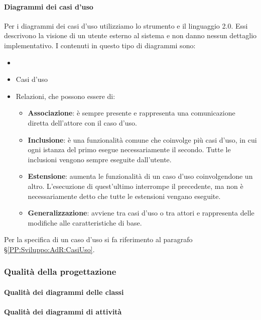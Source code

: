		\paragraph{Diagrammi dei casi d'uso}\label{DiagrammiCasiUso}
		Per i diagrammi dei casi d'uso utilizziamo lo strumento  e il linguaggio  2.0. Essi descrivono la visione di un utente
		esterno al sistema e non danno nessun dettaglio implementativo. I  contenuti in questo tipo di diagrammi sono:
		\begin{itemize}
			\item {}
			\item Casi d'uso
			\item Relazioni, che possono essere di:
			\begin{itemize}
				\item \textbf{Associazione}: è sempre presente e rappresenta una comunicazione diretta dell'attore con il caso d'uso.
				\item \textbf{Inclusione}: è una funzionalità comune che coinvolge più casi d'uso, in cui ogni istanza del primo esegue
					necessariamente il secondo. Tutte le inclusioni vengono sempre eseguite dall'utente.
				\item \textbf{Estensione}: aumenta le funzionalità di un caso d'uso coinvolgendone un altro. L'esecuzione di quest'ultimo interrompe il precedente, ma non è necessariamente detto che tutte le estensioni vengano eseguite.
				\item \textbf{Generalizzazione}: avviene tra casi d'uso o tra attori e rappresenta delle modifiche alle caratteristiche di base.
			\end{itemize}
		\end{itemize}
		Per la specifica di un caso d'uso si fa riferimento al paragrafo \S\ref{PP:Sviluppo:AdR:CasiUso}.
		
		
		\subsubsection{Qualità della progettazione} %
		
		\paragraph{Qualità dei diagrammi delle classi} %
		
		\paragraph{Qualità dei diagrammi di attività} %
		
